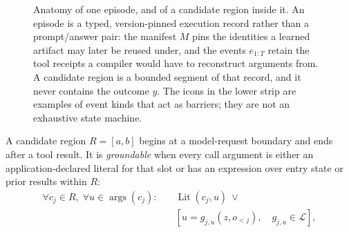 \begin{figure}[t]
  \centering
  
  \caption{Anatomy of one episode, and of a candidate region inside it.  An episode is a
  typed, version-pinned execution record rather than a prompt/answer pair: the manifest
  $M$ pins the identities a learned artifact may later be reused under, and the events
  $e_{1:T}$ retain the tool receipts a compiler would have to reconstruct arguments from.
  A candidate region is a bounded segment of that record, and it never contains the
  outcome $y$.  The icons in the lower strip are examples of event kinds that act as
  barriers; they are not an exhaustive state machine.}
  \label{fig:episode-anatomy}
\end{figure}

A candidate region $R=[a,b]$ begins at a model-request boundary and ends after a tool
result.  It is \emph{groundable} when every call argument is either an
application-declared literal for that slot or has an expression over entry state or prior
results within $R$:
\begin{equation}
  \begin{aligned}
    \forall c_j \in R,\; \forall u \in \operatorname{args}(c_j):\quad
    &\operatorname{Lit}(c_j,u)\ \vee\\[-2pt]
    &\left[u = g_{j,u}\!\left(z,o_{<j}\right),\quad g_{j,u}\in\mathcal{L}\right],
  \end{aligned}
  \label{eq:grounding}
\end{equation}

